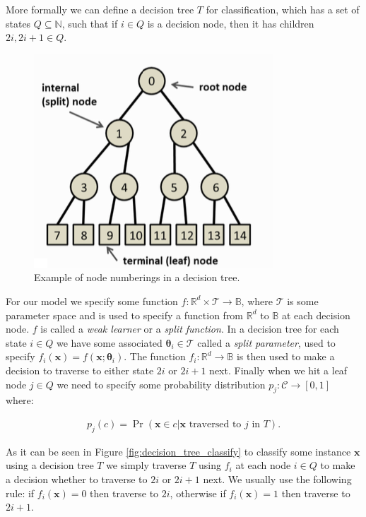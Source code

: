 \documentclass[12pt,twoside,notitlepage]{report}
\newcommand{\vc}[1]{\mathbf{#1}}
\newcommand{\cl}[1]{\mathcal{#1}}
\newcommand{\bb}[1]{\mathbb{#1}}
\begin{document}
            More formally we can define a decision tree $T$ for classification, which has a set of states $Q \subseteq 
            \bb{N}$, such that if $i \in Q$ is a decision node, then it has children $2i, 2i+1 \in Q$. 

            \begin{figure}
                \centering
                \includegraphics[scale=0.5]{tree_node_labels}
                \caption{Example of node numberings in a decision tree.}
            \end{figure}

            For our model we specify some function $f:\bb{R}^d \times \cl{T} \rightarrow \bb{B}$, where $\cl{T}$ is some 
            parameter space and is used to specify a function from $\bb{R}^d$ to $\bb{B}$ at each decision node.  
            $f$ is called a \textit{weak learner} or a \textit{split function}. In a decision tree for each state $i \in Q$ we have 
            some associated $\vc{\theta}_i \in \cl{T}$ called a \textit{split parameter}, used to specify 
            $f_i(\vc{x}) = f(\vc{x}; \vc{\theta}_i)$. The function $f_i : \bb{R}^d \rightarrow \bb{B}$ is then used to 
            make a decision to traverse to either state $2i$ or $2i+1$ next. Finally when we hit a leaf node $j \in Q$ we need 
            to specify some probability distribution $p_j:\cl{C} \rightarrow [0,1]$ where:

            \begin{align}
                p_j(c) = \Pr(\vc{x} \in c | \vc{x} \text{ traversed to } j \text{ in } T).
            \end{align}

            As it can be seen in Figure \ref{fig:decision_tree_classify} to classify some instance $\vc{x}$ using a 
            decision tree $T$ we simply traverse $T$ using $f_i$ at each node $i \in Q$ to make a decision whether 
            to traverse to $2i$ or $2i+1$ next. We usually use the following rule: if $f_i(\vc{x}) = 0$ then traverse to 
            $2i$, otherwise if $f_i(\vc{x}) = 1$ then traverse to $2i+1$. \cite{criminisi2013decision}
\end{document}
